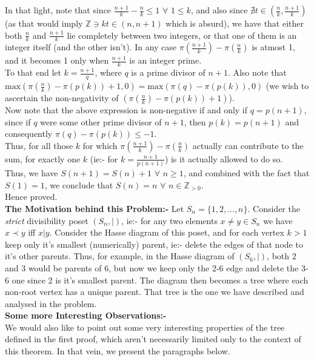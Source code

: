 \documentclass{article}
\begin{document}
In that light, note that since $\frac{n+1}{k} - \frac{n}{k} \leq 1$ $\forall$ $1 \leq k $, and also since $\nexists t \in (\frac{n}{k}, \frac{n+1}{k})$ (as that would imply $\mathbb{Z} \ni kt \in (n, n+1)$ which is absurd), we have that either both $\frac{n}{k}$ and $\frac{n+1}{k}$ lie completely between two integers, or that one of them is an integer itself (and the other isn't). In any case $\pi(\frac{n+1}{k}) - \pi(\frac{n}{k})$ is atmost 1, and it becomes 1 only when $\frac{n+1}{k}$ is an integer prime.\\
To that end let $k = \frac{n+1}{q}$, where $q$ is a prime divisor of $n+1$. Also note that $\mathrm{max}(\pi(\frac{n}{k}) - \pi(p(k)) + 1, 0) = \mathrm{max}(\pi(q) - \pi(p(k)), 0)$ (we wish to ascertain the non-negativity of $(\pi(\frac{n}{k}) - \pi(p(k)) + 1)$).\\
Now note that the above expression is non-negative if and only if $q = p(n+1)$, since if $q$ were some other prime divisor of $n+1$, then $p(k) = p(n+1)$ and consequently $\pi(q) - \pi(p(k)) \leq -1$.\\
Thus, for all those $k$ for which $\pi(\frac{n+1}{k}) - \pi(\frac{n}{k})$ actually can contribute to the sum, for exactly one $k$ (ie:- for $k = \frac{n+1}{p(n+1)}$) is it actually allowed to do so.\\
Thus, we have $S(n+1) = S(n) + 1$ $\forall$ $n \geq 1$, and combined with the fact that $S(1) = 1$, we conclude that $S(n) = n$ $\forall$ $n \in \mathbb{Z}_{>0}$.\\
Hence proved.\\
\textbf{The Motivation behind this Problem:-} Let $S_n = \{1, 2,..., n\}$. Consider the \emph{strict} divisibility poset $(S_n,|)$, ie:- for any two elements $x \neq y \in S_n$ we have $x \prec y$ iff $x|y$. Consider the Hasse diagram of this poset, and for each vertex $k > 1$ keep only it's smallest (numerically) parent, ie:- delete the edges of that node to it's other parents. Thus, for example, in the Hasse diagram of $(S_6,|)$, both 2 and 3 would be parents of 6, but now we keep only the 2-6 edge and delete the 3-6 one since 2 is it's smallest parent. The diagram then becomes a tree where each non-root vertex has a unique parent. That tree is the one we have described and analysed in the problem.\\
{\bf Some more Interesting Observations:-}\\
We would also like to point out some very interesting properties of the tree defined in the first proof, which aren't necessarily limited only to the context of this theorem. In that vein, we present the paragraphs below.\\
\end{document}
